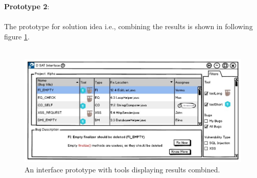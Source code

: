 \textbf{Prototype 2}: \\ \\

The prototype for solution idea i.e., combining the results is shown in following figure \ref{fig:toolCombine}. \\ \\

\begin{figure}[hbt!]
	\centering
	\includegraphics[width=\linewidth]{figures/d_combine}
	\caption{An interface prototype with tools displaying results combined.}
	\label{fig:toolCombine}
\end{figure}

\let\cleardoublepage\clearpage